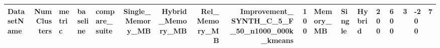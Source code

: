 \begin{tabular}{lrlllrrrrr}
\toprule
DatasetName & NumClusters & metric & baseline & compare_suite & Single_Memory_MB & Hybrid_Memory_MB & Rel_Memory_MB & Improvement_%
\midrule
SYNTH_C_5_F_50_n1000_000k_kmeans & 100 & Memory_MB & Single & Hybrid & 200 & 600 & 3 & -200 & 7 \\
\bottomrule
\end{tabular}
